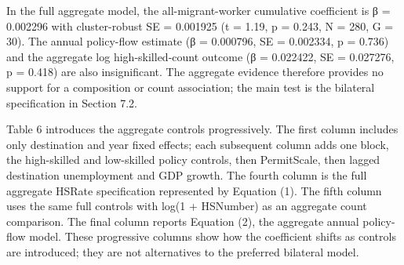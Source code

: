 \documentclass[11pt,a4paper]{article}
\begin{document}
In the full aggregate model, the all-migrant-worker cumulative
coefficient is β = 0.002296 with cluster-robust SE = 0.001925 (t = 1.19,
p = 0.243, N = 280, G = 30). The annual policy-flow estimate (β =
0.000796, SE = 0.002334, p = 0.736) and the aggregate log
high-skilled-count outcome (β = 0.022422, SE = 0.027276, p = 0.418) are
also insignificant. The aggregate evidence therefore provides no support
for a composition or count association; the main test is the bilateral
specification in Section 7.2.

Table 6 introduces the aggregate controls progressively. The first
column includes only destination and year fixed effects; each subsequent
column adds one block, the high-skilled and low-skilled policy controls,
then PermitScale, then lagged destination unemployment and GDP growth.
The fourth column is the full aggregate HSRate specification represented
by Equation (1). The fifth column uses the same full controls with log(1
+ HSNumber) as an aggregate count comparison. The final column reports
Equation (2), the aggregate annual policy-flow model. These progressive
columns show how the coefficient shifts as controls are introduced; they
are not alternatives to the preferred bilateral model.
\end{document}
